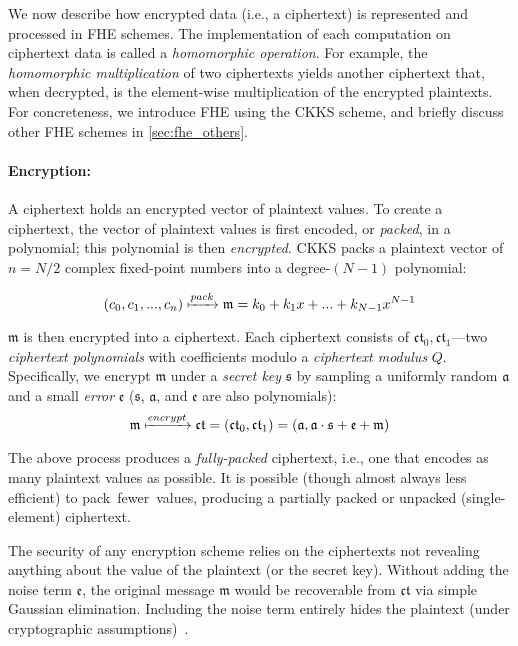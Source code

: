We now describe how encrypted data (i.e., a ciphertext) is represented and
processed in FHE schemes. The implementation of each computation on ciphertext
data is called a \emph{homomorphic operation}. For example, the
\emph{homomorphic multiplication} of two ciphertexts yields another ciphertext
that, when decrypted, is the element-wise multiplication of the encrypted
plaintexts. For concreteness, we introduce FHE using the CKKS scheme, and
briefly discuss other FHE schemes in \autoref{sec:fhe_others}.

\paragraph{Encryption:} A ciphertext holds an encrypted vector of plaintext values.
To create a ciphertext, the vector of plaintext values is first encoded, or \emph{packed},
in a polynomial; this polynomial is then \emph{encrypted}.
CKKS packs a plaintext vector of $ n = N/2$ complex fixed-point numbers
into a degree-$(N-1)$ polynomial:

\begin{equation*}
    (c_0, c_1, ..., c_n) \xmapsto{pack} \mathfrak{m} = k_0 + k_1x + ... + k_{N-1}x^{N-1} %
\end{equation*}

$\mathfrak{m}$ is then encrypted into a ciphertext. Each ciphertext consists of
$\mathfrak{ct}_0, \mathfrak{ct}_1$---two \emph{ciphertext polynomials}
with coefficients modulo a \emph{ciphertext modulus} $Q$.
Specifically, we encrypt $\mathfrak{m}$
under a \emph{secret key} $\mathfrak{s}$
by sampling a uniformly random $\mathfrak{a}$
and a small \emph{error} $\mathfrak{e}$ ($\mathfrak{s}$, $\mathfrak{a}$, and $\mathfrak{e}$ are also polynomials):
\begin{equation*}
    \mathfrak{m} \xmapsto{encrypt} \mathfrak{ct} = (\mathfrak{ct}_0, \mathfrak{ct}_1) = (\mathfrak{a}, \mathfrak{a}\cdot\mathfrak{s}+\mathfrak{e}+\mathfrak{m})
\end{equation*}

The above process produces a \emph{fully-packed} ciphertext, i.e., one
that encodes as many plaintext values as possible. It is possible
(though almost always less efficient) to pack~fewer~values,
producing a partially packed or unpacked (single-element) ciphertext.

The security of any encryption scheme relies on the ciphertexts not revealing
anything about the value of the plaintext (or the secret key). Without adding
the noise term $\mathfrak{e}$, the original message $\mathfrak{m}$ would be
recoverable from $\mathfrak{ct}$ via simple Gaussian elimination. Including the
noise term entirely hides the plaintext (under cryptographic
assumptions)~\cite{lyubashevsky:tact10:ideal}.

